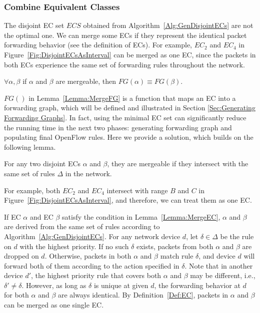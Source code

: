\subsubsection{Combine Equivalent Classes}
The disjoint EC set $ECS$ obtained from Algorithm~\ref{Alg:GenDisjointECs} are not the optimal one. 
We can merge some ECs if they represent the identical packet forwarding behavior (see the definition of ECs). 
For example, $EC_2$ and $EC_4$ in Figure~\ref{Fig:DisjointECsAsInterval} can be merged as one EC, since the packets in both ECs experience the same set of forwarding rules throughout the network. %

\begin{lemma}
$\forall \alpha, \beta $ if $\alpha$ and $\beta$ are mergeable, then $FG(\alpha) \equiv FG(\beta)$.
\label{Lemma:MergeFG}
\end{lemma}
$FG()$ in Lemma~\ref{Lemma:MergeFG} is a function that maps an EC into a forwarding graph, which will be defined and illustrated in Section \ref{Sec:Generating Forwarding Graphs}. In fact, using the minimal EC set can significantly reduce the running time in the next two phases: generating forwarding graph and populating final OpenFlow rules. Here we provide a solution, which builds on the following lemma.

\begin{lemma}
For any two disjoint ECs $\alpha$ and $\beta$, they are mergeable
if they intersect with the same set of rules $\Delta$ in the network.
\label{Lemma:MergeEC}
\end{lemma}
For example, both $EC_2$ and $EC_4$ intersect with range $B$ and $C$ in Figure~\ref{Fig:DisjointECsAsInterval}, and therefore, we can treat them as one EC.

If EC $\alpha$ and EC $\beta$ satisfy the condition in Lemma~\ref{Lemma:MergeEC},
$\alpha$ and $\beta$ are derived from the same set of rules according to Algorithm~\ref{Alg:GenDisjointECs}.
For any network device $d$, let $\delta \in \Delta$ be the rule on $d$ with the highest priority.
If no such $\delta$ exists, packets from both $\alpha$ and $\beta$ are dropped on $d$.
Otherwise, packets in both $\alpha$ and $\beta$ match rule $\delta$, and
device $d$ will forward both of them according to the action specified in $\delta$.
Note that in another device $d'$, the highest priority rule that covers both $\alpha$
and $\beta$ may be different, i.e., $\delta' \neq \delta$.
However, as long as $\delta$ is unique at given $d$, the forwarding behavior at $d$ for both $\alpha$ and $\beta$ are always identical.
By Definition~\ref{Def:EC}, packets in $\alpha$ and $\beta$ can be merged as one single EC.

